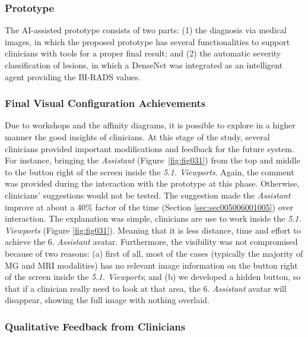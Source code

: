\subsubsection{Prototype}
\label{sec:sec005006002005}

The \ac{AI}-assisted prototype consists of two parts:
(1) the diagnosis via medical images, in which the proposed prototype has several functionalities to support clinicians with tools for a proper final result; and
(2) the automatic severity classification of lesions, in which a DenseNet was integrated as an intelligent agent providing the \ac{BI-RADS} values.

\subsubsection{Final Visual Configuration Achievements}
\label{sec:sec005006002006}

Due to workshops and the affinity diagrams, it is possible to explore in a higher manner the good insights of clinicians.
At this stage of the study, several clinicians provided important modifications and feedback for the future system.
For instance, bringing the {\it Assistant} (Figure~\ref{fig:fig031}) from the top and middle to the button right of the screen inside the {\it 5.1. Viewports}.
Again, the comment was provided during the interaction with the prototype at this phase.
Otherwise, clinicians' suggestions would not be tested.
The suggestion made the {\it Assistant} improve at about a 40\% factor of the time (Section \ref{sec:sec005006001005}) over interaction.
The explanation was simple, clinicians are use to work inside the {\it 5.1. Viewports} (Figure \ref{fig:fig031}).
Meaning that it is less distance, time and effort to achieve the {6. \it Assistant} avatar.
Furthermore, the visibility was not compromised because of two reasons: (a) first of all, most of the cases (typically the majority of MG and MRI modalities) has no relevant image information on the button right of the screen inside the {\it 5.1. Viewports}; and (b) we developed a hidden button, so that if a clinician really need to look at that area, the {6. \it Assistant} avatar will disappear, showing the full image with nothing overlaid.

\subsubsection{Qualitative Feedback from Clinicians}
\label{sec:sec005006002007}

